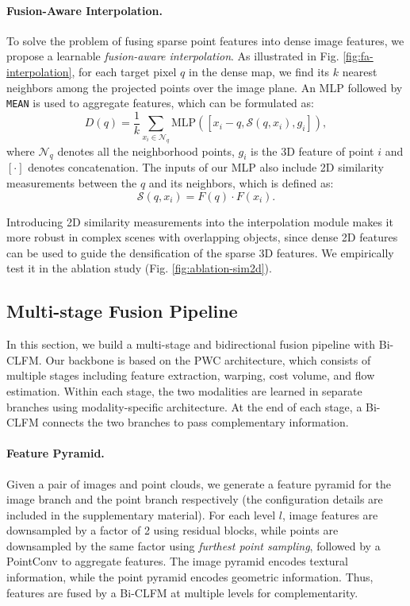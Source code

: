 \documentclass[10pt,twocolumn,letterpaper]{article}
\begin{document}
\paragraph{Fusion-Aware Interpolation.} To solve the problem of fusing sparse point features into dense image features, we propose a learnable \textit{fusion-aware interpolation}. As illustrated in Fig. \ref{fig:fa-interpolation}, for each target pixel $q$ in the dense map, we find its $k$ nearest neighbors among the projected points over the image plane. An MLP followed by \texttt{MEAN} is used to aggregate features, which can be formulated as:
\begin{equation}
    D(q) = \frac{1}{k} \sum_{x_i \in \mathcal{N}_q } \text{MLP}([x_i - q, \mathcal{S}(q, x_i), g_i]),
\end{equation}
where $\mathcal{N}_q$ denotes all the neighborhood points, $g_i$ is the 3D feature of point $i$ and $[\cdot]$ denotes concatenation. The inputs of our MLP also include 2D similarity measurements between the $q$ and its neighbors, which is defined as:
\begin{equation}
    \mathcal{S}(q, x_i) = F(q) \cdot F(x_i).
\end{equation}

Introducing 2D similarity measurements into the interpolation module makes it more robust in complex scenes with overlapping objects, since dense 2D features can be used to guide the densification of the sparse 3D features. We empirically test it in the ablation study (Fig. \ref{fig:ablation-sim2d}).

\subsection{Multi-stage Fusion Pipeline}

In this section, we build a multi-stage and bidirectional fusion pipeline with Bi-CLFM. Our backbone is based on the PWC architecture, which consists of multiple stages including feature extraction, warping, cost volume, and flow estimation. Within each stage, the two modalities are learned in separate branches using modality-specific architecture. At the end of each stage, a Bi-CLFM connects the two branches to pass complementary information.

\vspace{-10pt}
\paragraph{Feature Pyramid.} Given a pair of images and point clouds, we generate a feature pyramid for the image branch and the point branch respectively (the configuration details are included in the supplementary material). For each level $l$, image features are downsampled by a factor of 2 using residual blocks, while points are downsampled by the same factor using \textit{furthest point sampling}, followed by a PointConv \cite{wu2019pointconv} to aggregate features. The image pyramid encodes textural information, while the point pyramid encodes geometric information. Thus, features are fused by a Bi-CLFM at multiple levels for complementarity.
\end{document}
